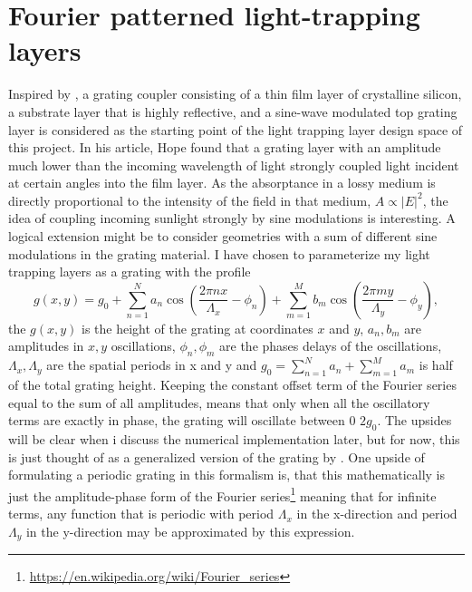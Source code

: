 \section{Fourier patterned light-trapping layers}
\label{sec:Fourier}
Inspired by \cite{HOPE}, a grating coupler consisting of a thin film layer of crystalline silicon, a substrate layer that is highly reflective, and a sine-wave modulated top grating layer is considered
as the starting point of the light trapping layer design space of this project. In his article, Hope found that a grating layer with an amplitude much lower than the incoming wavelength of light strongly coupled light incident at certain angles into the film layer.
As the absorptance in a lossy medium is directly proportional to the intensity of the field in that medium, $A \propto |E|^2$, the idea of coupling incoming sunlight strongly by sine modulations is interesting.
A logical extension might be to consider geometries with a sum of different sine modulations in the grating material. I have chosen to parameterize my light trapping layers as a grating with the profile
\begin{equation}
\label{eq:grating}
g(x,y) = g_0 + \sum_{n=1}^{N}a_{n} \cos{\left(\frac{2\pi n x}{\Lambda_x}-\phi_n\right)}+ \sum_{m=1}^{M}b_{m} \cos{\left(\frac{2\pi m y}{\Lambda_y}-\phi_y\right)},
\end{equation}
the $g(x,y)$ is the height of the grating at coordinates $x$ and $y$, $a_n,b_m$ are amplitudes in $x,y$ oscillations, $\phi_n,\phi_m$ are the phases delays of the oscillations, $\Lambda_x,\Lambda_y$ are the spatial periods in x and y and $g_0=\sum_{n=1}^{N} a_n + \sum_{m=1}^{M} a_m$ is half of the total grating height. Keeping the constant offset term of the Fourier series equal to the sum of all amplitudes, means that only when all the oscillatory terms
are exactly in phase, the grating will oscillate between $0$ $2g_0$. The upsides will be clear when i discuss the numerical implementation later, but for now, this is just thought of as a generalized version of the grating by \cite{HOPE}.
One upside of formulating a periodic grating in this formalism is, that this mathematically is just the amplitude-phase form of the Fourier series\footnote{\url{https://en.wikipedia.org/wiki/Fourier_series}} meaning that for infinite terms, any function that is periodic with period $\Lambda_x$ in the x-direction and period $\Lambda_y$ in the y-direction
may be approximated by this expression.

